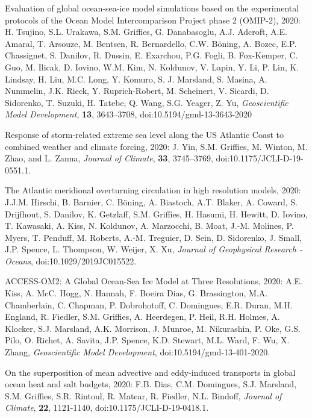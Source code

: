 \begin{etaremune}
\item Evaluation of global ocean-sea-ice model simulations based on the experimental protocols of the Ocean Model Intercomparison Project phase 2 (OMIP-2), 2020: H. Tsujino, S.L. Urakawa, S.M. Griffies, G. Danabasoglu, A.J. Adcroft, A.E. Amaral, T. Arsouze, M. Bentsen, R. Bernardello, C.W. {B\"{o}ning}, A. Bozec, E.P. Chassignet, S. Danilov, R. Dussin, E. Exarchou, P.G. Fogli, B. Fox-Kemper, C. Guo, M. Ilicak, D. Iovino, W.M. Kim, N. Koldunov, V. Lapin, Y. Li, P. Lin, K. Lindsay, H. Liu, M.C. Long, Y. Komuro, S. J. Marsland, S. Masina, A. Nummelin, J.K. Rieck, Y. Ruprich-Robert, M. Scheinert, V. Sicardi, D. Sidorenko, T. Suzuki, H. Tatebe, Q. Wang, S.G. Yeager, Z. Yu, {\it  Geoscientific Model Development}, {\bf 13}, 3643--3708, doi:10.5194/gmd-13-3643-2020

\item Response of storm-related extreme sea level along the US Atlantic Coast to combined weather and climate forcing, 2020: J. Yin, S.M. Grif\/f\/ies, M. Winton, M. Zhao, and L. Zanna, {\it Journal of Climate}, {\bf 33}, 3745--3769, doi:10.1175/JCLI-D-19-0551.1.

\item The Atlantic meridional overturning circulation in high resolution models, 2020: J.J.M. Hirschi, B. Barnier, C. {B\"{o}ning}, A. Biastoch, A.T. Blaker, A. Coward, S. Drijfhout, S. Danilov, K. Getzlaff, S.M. Grif\/f\/ies, H. Hasumi, H. Hewitt, D. Iovino, T. Kawasaki, A. Kiss, N. Koldunov, A. Marzocchi, B. Moat, J.-M. Molines, P. Myers, T. Penduff, M. Roberts, A.-M. Treguier, D. Sein, D. Sidorenko, J. Small, J.P. Spence, L. Thompson, W. Weijer, X. Xu, {\it Journal of Geophysical Research - Oceans}, doi:10.1029/2019JC015522.

\item ACCESS-OM2: A Global Ocean-Sea Ice Model at Three Resolutions, 2020: A.E. Kiss, A. McC. Hogg, N. Hannah, F. Boeira Dias, G. Brassington, M.A. Chamberlain, C. Chapman, P. Dobrohotoff, C. Domingues, E.R. Duran, M.H. England, R. Fiedler, S.M. Grif\/f\/ies,  A. Heerdegen, P. Heil, R.H. Holmes, A. Klocker, S.J. Marsland, A.K. Morrison, J. Munroe, M. Nikurashin, P. Oke, G.S. Pilo, O. Richet, A. Savita, J.P. Spence, K.D. Stewart, M.L. Ward, F. Wu, X. Zhang, {\it Geoscientific Model Development}, doi:10.5194/gmd-13-401-2020.

\item On the superposition of mean advective and eddy-induced transports in global ocean heat and salt budgets, 2020: F.B. Dias, C.M. Domingues, S.J. Marsland, S.M. Grif\/f\/ies, S.R. Rintoul, R. Matear, R. Fiedler, N.L. Bindoff, {\it Journal of Climate}, {\bf 22}, 1121-1140, doi:10.1175/JCLI-D-19-0418.1.


\end{etaremune}
